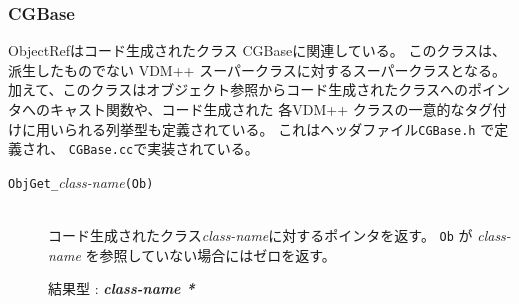 \documentclass[\pformat,12pt]{jarticle}
\newcommand{\VDM}{VDM++}
\begin{document}
\subsubsection{CGBase}
\label{sec:cgbase}

 ObjectRefはコード生成されたクラス CGBaseに関連している。
このクラスは、派生したものでない \VDM{} スーパークラスに対するスーパークラスとなる。
加えて、このクラスはオブジェクト参照からコード生成されたクラスへのポインタへのキャスト関数や、コード生成された 各\VDM{} クラスの一意的なタグ付けに用いられる列挙型も定義されている。
これはヘッダファイル\texttt{CGBase.h} で定義され、 \texttt{CGBase.cc}で実装されている。
\begin{description}
\item [\texttt{ObjGet\_}\textit{class-name}\texttt{(Ob)}] \mbox{}\\
  コード生成されたクラス\textit{class-name}に対するポインタを返す。 
 \texttt{Ob} が  \textit{class-name} を参照していない場合にはゼロを返す。

  結果型 : \textbf{\textit{class-name *}}
\end{description}
\end{document}
